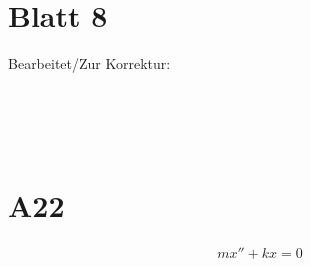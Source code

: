\documentclass[fleqn,12pt]{scrartcl}
\newcommand{\blattn}{Blatt 8}
\begin{document}
\section*{\blattn}
Bearbeitet/Zur Korrektur:

\noindent
\begin{Form}
	\\
	\\
	\\
\end{Form}

\section{A22}
\begin{align*}
	mx'' + kx = 0
\end{align*}
\end{document}
